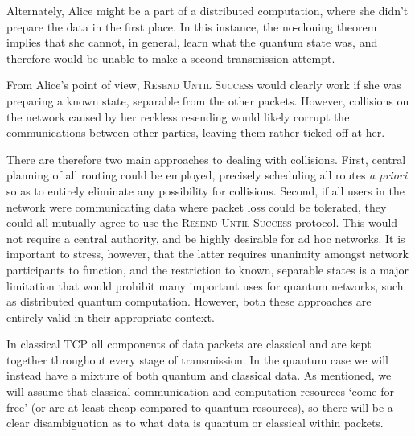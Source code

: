 \documentclass[aps,rmp,twocolumn,amsmath,amssymb,nofootinbib,superscriptaddress,longbibliography,floatfix,table-of-contents,eqsecnum]{revtex4-1}
\begin{document}
Alternately, Alice might be a part of a distributed computation, where she didn't prepare the data in the first place. In this instance, the no-cloning theorem implies that she cannot, in general, learn what the quantum state was, and therefore would be unable to make a second transmission attempt.

From Alice's point of view, \textsc{Resend Until Success} would clearly work if she was preparing a known state, separable from the other packets. However, collisions on the network caused by her reckless resending would likely corrupt the communications between other parties, leaving them rather ticked off at her.

There are therefore two main approaches to dealing with collisions. First, central planning of all routing could be employed, precisely scheduling all routes \textit{a priori} so as to entirely eliminate any possibility for collisions. Second, if all users in the network were communicating data where packet loss could be tolerated, they could all mutually agree to use the \textsc{Resend Until Success} protocol. This would not require a central authority, and be highly desirable for ad hoc networks. It is important to stress, however, that the latter requires unanimity amongst network participants to function, and the restriction to known, separable states is a major limitation that would prohibit many important uses for quantum networks, such as distributed quantum computation. However, both these approaches are entirely valid in their appropriate context.

In classical TCP all components of data packets are classical and are kept together throughout every stage of transmission. In the quantum case we will instead have a mixture of both quantum and classical data. As mentioned, we will assume that classical communication and computation resources `come for free' (or are at least cheap compared to quantum resources), so there will be a clear disambiguation as to what data is quantum or classical within packets.
\end{document}
